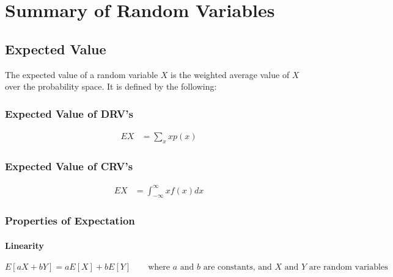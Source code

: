 \section{Summary of Random Variables}
\subsection{Expected Value}
The expected value of a random variable $X$ is the weighted average value of $X$ over the probability space. It is defined by the following:
\begin{paracol}{2}
    \subsubsection{Expected Value of DRV's}
    \syncallcounters
    \begin{equation*}
    \begin{aligned}
        EX &= \sum_{x}xp(x)
    \end{aligned}
    \end{equation*}

    \switchcolumn \subsubsection{Expected Value of CRV's}
    \syncallcounters
    \begin{equation*}
    \begin{aligned}
        EX &= \int_{-\infty}^{\infty}xf(x)dx
    \end{aligned}
    \end{equation*}

\end{paracol}

\subsubsection{Properties of Expectation}
\paragraph{Linearity}
$$E[aX+bY] = aE[X] + bE[Y] \qquad \text{where $a$ and $b$ are constants, and $X$ and $Y$ are random variables}$$

